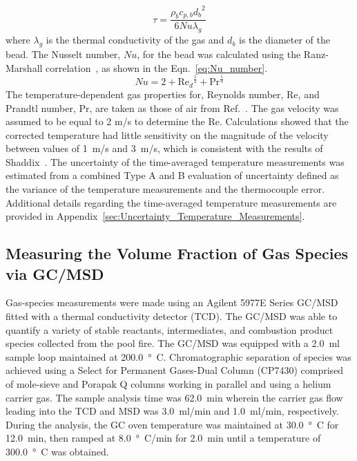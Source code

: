 \documentclass[12pt]{article}
\begin{document}
\begin{equation}\label{eq:tau}
\tau= \frac{\rho_{b}c_{p,b}{d_{b}}^2}{6Nu\lambda_{g}}
\end{equation}
where $\lambda_{g}$ is the thermal conductivity of the gas and $d_{b}$ is the diameter of the bead. The Nusselt number, $Nu$, for the bead was calculated using the Ranz-Marshall correlation~\cite{Shaddix1999}, as shown in the Eqn.~\ref{eq:Nu_number}.
\begin{equation}\label{eq:Nu_number}
Nu= 2+{\textrm{Re}_{d}}^{\frac{1}{2}}+\textrm{Pr}^{\frac{1}{3}}
\end{equation}
The temperature-dependent gas properties for, Reynolds number, Re, and Prandtl number, Pr, are taken as those of air from Ref.~\cite{Dippr}. The gas velocity was assumed to be equal to 2 m/s to determine the Re. Calculations showed that the corrected temperature had little sensitivity on the magnitude of the velocity between values of \SI{1}{ m/s} and \SI{3}{m/s}, which is consistent with the results of Shaddix~\cite{Shaddix1999}. The uncertainty of the time-averaged temperature measurements was estimated from a combined Type A and B evaluation of uncertainty defined as the variance of the temperature measurements and the thermocouple error. Additional details regarding the time-averaged temperature measurements are provided in Appendix~\ref{sec:Uncertainty_Temperature_Measurements}.

\subsection{Measuring the Volume Fraction of Gas Species via GC/MSD}
\label{ssec:Gas_Species_Setup}

Gas-species measurements were made using an Agilent 5977E Series GC/MSD fitted with a thermal conductivity detector (TCD). The GC/MSD was able to quantify a variety of stable reactants, intermediates, and combustion product species collected from the pool fire. The GC/MSD was equipped with a \SI{2.0}{ml} sample loop maintained at \SI{200.0}{\degree C}. Chromatographic separation of species was achieved using a Select for Permanent Gases-Dual Column (CP7430) comprised of mole-sieve and Porapak Q columns working in parallel and using a helium carrier gas. The sample analysis time was \SI{62.0}{min} wherein the carrier gas flow leading into the TCD and MSD was \SI{3.0}{ml/min} and \SI{1.0}{ml/min}, respectively. During the analysis, the GC oven temperature was maintained at \SI{30.0}{\degree C} for \SI{12.0}{min}, then ramped at \SI{8.0}{\degree C/min} for \SI{2.0}{min} until a temperature of \SI{300.0}{\degree C} was obtained.
\end{document}
